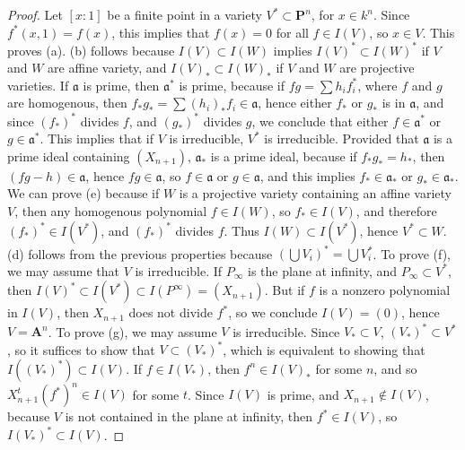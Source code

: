 \begin{proof}
    Let $[x:1]$ be a finite point in a variety $V^* \subset \mathbf{P}^n$, for $x \in k^n$. Since $f^*(x,1) = f(x)$, this implies that $f(x) = 0$ for all $f \in I(V)$, so $x \in V$. This proves (a). (b) follows because $I(V) \subset I(W)$ implies $I(V)^* \subset I(W)^*$ if $V$ and $W$ are affine variety, and $I(V)_* \subset I(W)_*$ if $V$ and $W$ are projective varieties. If $\mathfrak{a}$ is prime, then $\mathfrak{a}^*$ is prime, because if $fg = \sum h_i f_i^*$, where $f$ and $g$ are homogenous, then $f_*g_* = \sum (h_i)_* f_i \in \mathfrak{a}$, hence either $f_*$ or $g_*$ is in $\mathfrak{a}$, and since $(f_*)^*$ divides $f$, and $(g_*)^*$ divides $g$, we conclude that either $f \in \mathfrak{a}^*$ or $g \in \mathfrak{a}^*$. This implies that if $V$ is irreducible, $V^*$ is irreducible. Provided that $\mathfrak{a}$ is a prime ideal containing $(X_{n+1})$, $\mathfrak{a}_*$ is a prime ideal, because if $f_*g_* = h_*$, then $(fg - h) \in \mathfrak{a}$, hence $fg \in \mathfrak{a}$, so $f \in \mathfrak{a}$ or $g \in \mathfrak{a}$, and this implies $f_* \in \mathfrak{a}_*$ or $g_* \in \mathfrak{a}_*$. We can prove (e) because if $W$ is a projective variety containing an affine variety $V$, then any homogenous polynomial $f \in I(W)$, so $f_* \in I(V)$, and therefore $(f_*)^* \in I(V^*)$, and $(f_*)^*$ divides $f$. Thus $I(W) \subset I(V^*)$, hence $V^* \subset W$. (d) follows from the previous properties because $(\bigcup V_i)^* = \bigcup V_i^*$. To prove (f), we may assume that $V$ is irreducible. If $P_\infty$ is the plane at infinity, and $P_\infty \subset V^*$, then $I(V)^* \subset I(V^*) \subset I(P^\infty) = (X_{n+1})$. But if $f$ is a nonzero polynomial in $I(V)$, then $X_{n+1}$ does not divide $f^*$, so we conclude $I(V) = (0)$, hence $V = \mathbf{A}^n$. To prove (g), we may assume $V$ is irreducible. Since $V_* \subset V$, $(V_*)^* \subset V^*$, so it suffices to show that $V \subset (V_*)^*$, which is equivalent to showing that $I((V_*)^*) \subset I(V)$. If $f \in I(V_*)$, then $f^n \in I(V)_*$ for some $n$, and so $X_{n+1}^t(f^*)^n \in I(V)$ for some $t$. Since $I(V)$ is prime, and $X_{n+1} \not \in I(V)$, because $V$ is not contained in the plane at infinity, then $f^* \in I(V)$, so $I(V_*)^* \subset I(V)$.
\end{proof}

